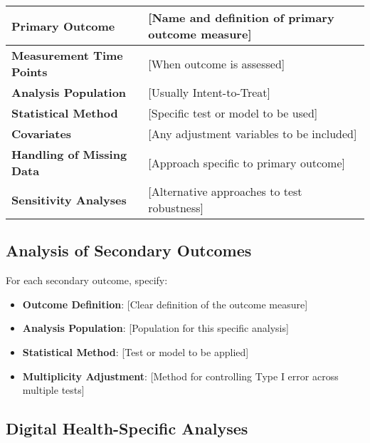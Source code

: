 \begin{tcolorbox}[title=Primary Outcome Analysis]
\begin{tabular}{|p{4cm}|p{10cm}|}
\hline
\textbf{Primary Outcome} & [Name and definition of primary outcome measure] \\
\hline
\textbf{Measurement Time Points} & [When outcome is assessed] \\
\hline
\textbf{Analysis Population} & [Usually Intent-to-Treat] \\
\hline
\textbf{Statistical Method} & [Specific test or model to be used] \\
\hline
\textbf{Covariates} & [Any adjustment variables to be included] \\
\hline
\textbf{Handling of Missing Data} & [Approach specific to primary outcome] \\
\hline
\textbf{Sensitivity Analyses} & [Alternative approaches to test robustness] \\
\hline
\end{tabular}
\end{tcolorbox}

\subsection{Analysis of Secondary Outcomes}

For each secondary outcome, specify:

\begin{itemize}
    \item \textbf{Outcome Definition}: [Clear definition of the outcome measure]
    
    \item \textbf{Analysis Population}: [Population for this specific analysis]
    
    \item \textbf{Statistical Method}: [Test or model to be applied]
    
    \item \textbf{Multiplicity Adjustment}: [Method for controlling Type I error across multiple tests]
\end{itemize}

\subsection{Digital Health-Specific Analyses}

